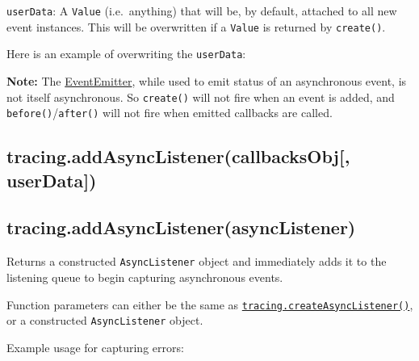 \texttt{userData}: A \texttt{Value} (i.e.~anything) that will be, by
default, attached to all new event instances. This will be overwritten
if a \texttt{Value} is returned by \texttt{create()}.

Here is an example of overwriting the \texttt{userData}:

\begin{Shaded}
\begin{Highlighting}[]
\NormalTok{(\{}
  \NormalTok{: } 
     \NormalTok{;}
\NormalTok{\}, \{}
  \NormalTok{: } 
  \NormalTok{\}}
\NormalTok{\}, }\NormalTok{);}
\end{Highlighting}
\end{Shaded}

\textbf{Note:} The
\href{events.html\#events_class_events_eventemitter}{EventEmitter},
while used to emit status of an asynchronous event, is not itself
asynchronous. So \texttt{create()} will not fire when an event is added,
and \texttt{before()}/\texttt{after()} will not fire when emitted
callbacks are called.

\subsection{tracing.addAsyncListener(callbacksObj{[},
userData{]})}\label{tracing.addasynclistenercallbacksobj-userdata}

\subsection{tracing.addAsyncListener(asyncListener)}\label{tracing.addasynclistenerasynclistener}

Returns a constructed \texttt{AsyncListener} object and immediately adds
it to the listening queue to begin capturing asynchronous events.

Function parameters can either be the same as
\hyperref[tracingux5ftracingux5fcreateasynclistenerux5fasynclistenerux5fcallbacksobjux5fstoragevalue]{\texttt{tracing.createAsyncListener()}},
or a constructed \texttt{AsyncListener} object.

Example usage for capturing errors:

